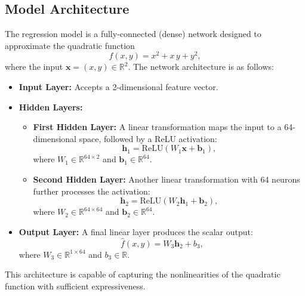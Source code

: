 \documentclass{article}
\begin{document}
\subsection*{Model Architecture}
The regression model is a fully-connected (dense) network designed to approximate the quadratic function
\[
f(x,y) = x^2 + x\,y + y^2,
\]
where the input \(\mathbf{x} = (x,y) \in \mathbb{R}^2\). The network architecture is as follows:
\begin{itemize}
    \item \textbf{Input Layer:}  
    Accepts a 2-dimensional feature vector.
    \item \textbf{Hidden Layers:}
    \begin{itemize}
        \item \textbf{First Hidden Layer:}  
        A linear transformation maps the input to a 64-dimensional space, followed by a ReLU activation:
        \[
        \mathbf{h}_1 = \text{ReLU}(W_1 \mathbf{x} + \mathbf{b}_1),
        \]
        where \(W_1 \in \mathbb{R}^{64 \times 2}\) and \(\mathbf{b}_1 \in \mathbb{R}^{64}\).
        \item \textbf{Second Hidden Layer:}  
        Another linear transformation with 64 neurons further processes the activation:
        \[
        \mathbf{h}_2 = \text{ReLU}(W_2 \mathbf{h}_1 + \mathbf{b}_2),
        \]
        where \(W_2 \in \mathbb{R}^{64 \times 64}\) and \(\mathbf{b}_2 \in \mathbb{R}^{64}\).
    \end{itemize}
    \item \textbf{Output Layer:}  
    A final linear layer produces the scalar output:
    \[
    \hat{f}(x,y) = W_3 \mathbf{h}_2 + b_3,
    \]
    where \(W_3 \in \mathbb{R}^{1 \times 64}\) and \(b_3 \in \mathbb{R}\).
\end{itemize}
This architecture is capable of capturing the nonlinearities of the quadratic function with sufficient expressiveness.
\end{document}
